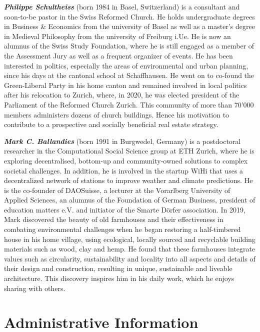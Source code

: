 \documentclass{article}
\begin{document}
\textbf{\textit{Philippe Schultheiss}} (born 1984 in Basel, Switzerland) is a consultant and soon-to-be pastor in the Swiss Reformed Church. He holds undergraduate degrees in Business \& Economics from the university of Basel as well as a master's degree in Medieval Philosophy from the university of Freiburg i.Ue. He is now an alumnus of the Swiss Study Foundation, where he is still engaged as a member of the Assessment Jury as well as a frequent organizer of events. He has been interested in politics, especially the areas of environmental and urban planning, since his days at the cantonal school at Schaffhausen. He went on to co-found the Green-Liberal Party in his home canton and remained involved in local politics after his relocation to Zurich, where, in 2020, he was elected president of the Parliament of the Reformed Church Zurich. This community of more than 70'000 members administers dozens of church buildings. Hence his motivation to contribute to a prospective and socially beneficial real estate strategy.

\textbf{\textit{Mark C. Ballandies}} (born 1991 in Burgwedel, Germany) is a postdoctoral researcher in the Computational Social Science group at ETH Zurich, where he is exploring decentralised, bottom-up and community-owned solutions to complex societal challenges. In addition, he is involved in the startup WiHi that uses a decentralized network of stations to improve weather and climate predictions. He is the co-founder of DAOSuisse, a lecturer at the Vorarlberg University of Applied Sciences, an alumnus of the Foundation of German Business, president of education matters e.V. and initiator of the Smarte Dörfer association. In 2019, Mark discovered the beauty of old farmhouses and their effectiveness in combating environmental challenges when he began restoring a half-timbered house in his home village, using ecological, locally sourced and recyclable building materials such as wood, clay and hemp. He found that these farmhouses integrate values such as circularity, sustainability and locality into all aspects and details of their design and construction, resulting in unique, sustainable and liveable architecture. This discovery inspires him in his daily work, which he enjoys sharing with others.

\clearpage

\tableofcontents

\section*{\centering Administrative Information}
\end{document}
